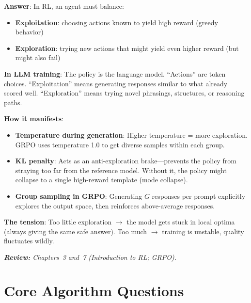 \begin{questionbox}
\textbf{Answer}: In RL, an agent must balance:

\begin{itemize}
  \item \textbf{Exploitation}: choosing actions known to yield high reward (greedy behavior)
  \item \textbf{Exploration}: trying new actions that might yield even higher reward (but might also fail)
\end{itemize}

\textbf{In LLM training}: The policy is the language model. ``Actions'' are token choices. ``Exploitation'' means generating responses similar to what already scored well. ``Exploration'' means trying novel phrasings, structures, or reasoning paths.

\textbf{How it manifests}:

\begin{itemize}
  \item \textbf{Temperature during generation}: Higher temperature = more exploration. GRPO uses temperature 1.0 to get diverse samples within each group.
  \item \textbf{KL penalty}: Acts as an anti-exploration brake---prevents the policy from straying too far from the reference model. Without it, the policy might collapse to a single high-reward template (mode collapse).
  \item \textbf{Group sampling in GRPO}: Generating $G$ responses per prompt explicitly explores the output space, then reinforces above-average responses.
\end{itemize}

\textbf{The tension}: Too little exploration $\rightarrow$ the model gets stuck in local optima (always giving the same safe answer). Too much $\rightarrow$ training is unstable, quality fluctuates wildly.

\emph{\textbf{Review:} Chapters~3 and~7 (Introduction to RL; GRPO).}
\end{questionbox}

\section{Core Algorithm Questions}
\label{core-algorithm-questions}

